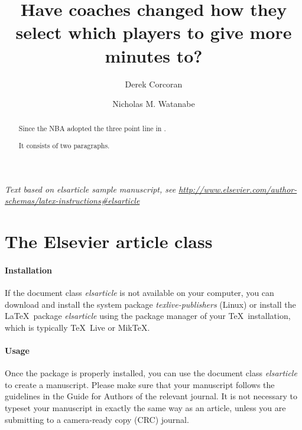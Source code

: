 \documentclass[]{elsarticle} %
\begin{document}
\begin{frontmatter}

  \title{Have coaches changed how they select which players to give more minutes
to?}
    \author[Pontificia Universidad Catolica de Chile]{Derek Corcoran}
    \author[The University of Mississippi]{Nicholas M. Watanabe}
  
      \address[Some Institute of Technology]{Department, Street, City, State, Zip}
    \address[Another University]{Department, Street, City, State, Zip}
  
  \begin{abstract}
  Since the NBA adopted the three point line in .
  
  It consists of two paragraphs.
  \end{abstract}
  
 \end{frontmatter}

\emph{Text based on elsarticle sample manuscript, see
\url{http://www.elsevier.com/author-schemas/latex-instructions\#elsarticle}}

\section{The Elsevier article class}\label{the-elsevier-article-class}

\paragraph{Installation}\label{installation}

If the document class \emph{elsarticle} is not available on your
computer, you can download and install the system package
\emph{texlive-publishers} (Linux) or install the LaTeX~package
\emph{elsarticle} using the package manager of your TeX~installation,
which is typically TeX~Live or MikTeX.

\paragraph{Usage}\label{usage}

Once the package is properly installed, you can use the document class
\emph{elsarticle} to create a manuscript. Please make sure that your
manuscript follows the guidelines in the Guide for Authors of the
relevant journal. It is not necessary to typeset your manuscript in
exactly the same way as an article, unless you are submitting to a
camera-ready copy (CRC) journal.
\end{document}

